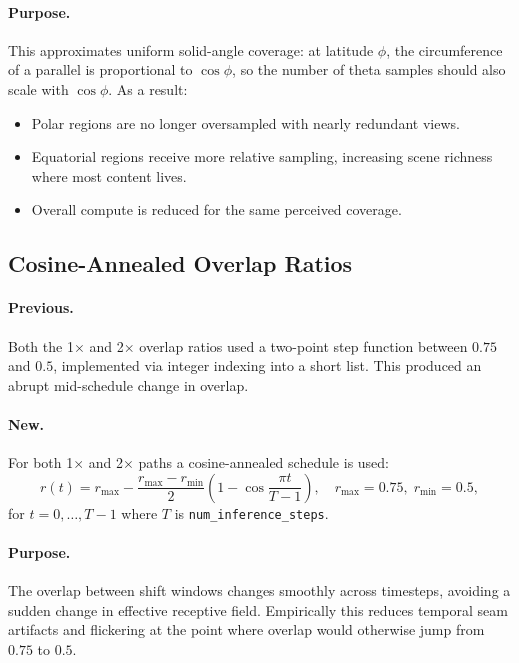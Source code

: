 \documentclass[11pt,a4paper]{article}
\newcommand{\fn}[1]{\texttt{#1}}
\begin{document}
\paragraph{Purpose.}
This approximates uniform solid-angle coverage:
at latitude \(\phi\), the circumference of a parallel is proportional to \(\cos\phi\),
so the number of theta samples should also scale with \(\cos\phi\).
As a result:
\begin{itemize}
    \item Polar regions are no longer oversampled with nearly redundant views.
    \item Equatorial regions receive more relative sampling, increasing scene richness where most content lives.
    \item Overall compute is reduced for the same perceived coverage.
\end{itemize}

\subsection{Cosine-Annealed Overlap Ratios}

\paragraph{Previous.}
Both the 1$\times$ and 2$\times$ overlap ratios used a two-point step function between \(0.75\) and \(0.5\),
implemented via integer indexing into a short list.
This produced an abrupt mid-schedule change in overlap.

\paragraph{New.}
For both 1$\times$ and 2$\times$ paths a cosine-annealed schedule is used:
\begin{equation}
    r(t) = r_{\max} - \frac{r_{\max}-r_{\min}}{2}
    \left(1 - \cos\frac{\pi t}{T-1}\right),
    \quad r_{\max}=0.75,\; r_{\min}=0.5,
\end{equation}
for \(t=0,\dots,T-1\) where \(T\) is \fn{num\_inference\_steps}.

\paragraph{Purpose.}
The overlap between shift windows changes smoothly across timesteps, avoiding a sudden change in effective receptive field.
Empirically this reduces temporal seam artifacts and flickering at the point where overlap would otherwise jump from \(0.75\) to \(0.5\).
\end{document}
